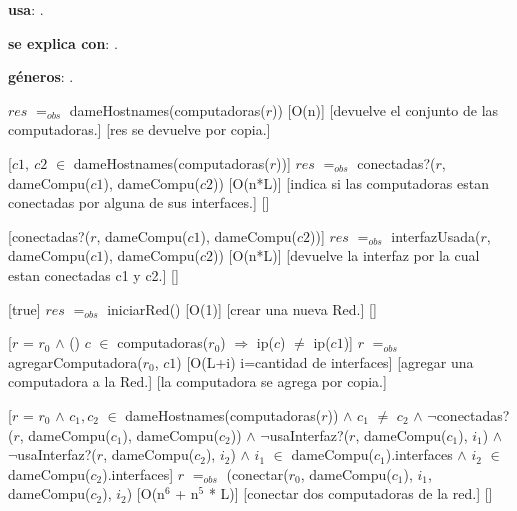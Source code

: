 \begin{Interfaz}

  \textbf{usa}: .
  
  \textbf{se explica con}: .

  \textbf{g\'eneros}: .


  {$res$ $=_{obs}$ dameHostnames(computadoras($r$))}%
  [O(n)]
  [devuelve el conjunto de las computadoras.]
  [res se devuelve por copia.]

  [$c1,\ c2$ $\in$ dameHostnames(computadoras($r$))]
  {$res$ $=_{obs}$ conectadas?($r$, dameCompu($c1$), dameCompu($c2$))}
  [O(n*L)]
  [indica si las computadoras estan conectadas por alguna de sus interfaces.]
  []

  [conectadas?($r$, dameCompu($c1$), dameCompu($c2$))]
  {$res$ $=_{obs}$ interfazUsada($r$, dameCompu($c1$), dameCompu($c2$))}
  [O(n*L)]
  [devuelve la interfaz por la cual estan conectadas c1 y c2.]
  []

  [true]
  {$res$ $=_{obs}$ iniciarRed()}
  [O(1)]
  [crear una nueva Red.]
  []
  
  [$r$ = $r_0$ $\wedge$
  () $c$ $\in$ computadoras($r_0$) $\Rightarrow$ ip($c$) $\neq$ ip($c1$)]
  {$r$ $=_{obs}$ agregarComputadora($r_0$, $c1$)}
  [O(L+i) i=cantidad de interfaces]
  [agregar una computadora a la Red.]
  [la computadora se agrega por copia.]

  [$r$ = $r_0$ $\wedge$ $c_1, c_2$ $\in$ dameHostnames(computadoras($r$)) $\wedge$ $c_1$ $\neq$ $c_2$	$\wedge$ \newline $\neg$conectadas?($r$, dameCompu($c_1$), dameCompu($c_2$)) $\wedge$ $\neg$usaInterfaz?($r$, dameCompu($c_1$), $i_1$) $\wedge$ $\neg$usaInterfaz?($r$, dameCompu($c_2$), $i_2$) $\wedge$ $i_1$ $\in$ dameCompu($c_1$).interfaces $\wedge$ $i_2$ $\in$ dameCompu($c_2$).interfaces]
  {$r$ $=_{obs}$ (conectar($r_0$, dameCompu($c_1$), $i_1$, dameCompu($c_2$), $i_2$)}
  [O(n$^{6}$ + n$^{5}$ * L)]
  [conectar dos computadoras de la red.]
  []
   

\end{Interfaz}
